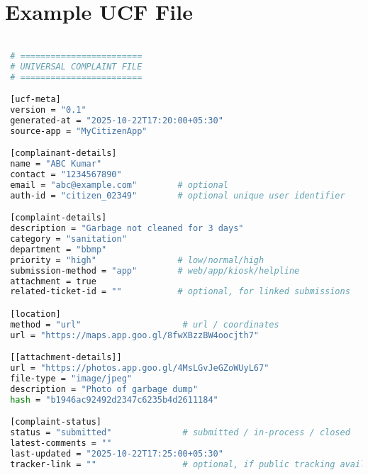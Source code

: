 
\section{Example UCF File}

\begin{lstlisting}[language=bash]

 # ========================
 # UNIVERSAL COMPLAINT FILE
 # ========================

 [ucf-meta]
 version = "0.1"
 generated-at = "2025-10-22T17:20:00+05:30"
 source-app = "MyCitizenApp"

 [complainant-details]
 name = "ABC Kumar"
 contact = "1234567890"
 email = "abc@example.com"        # optional
 auth-id = "citizen_02349"        # optional unique user identifier

 [complaint-details]
 description = "Garbage not cleaned for 3 days"
 category = "sanitation"
 department = "bbmp"
 priority = "high"                # low/normal/high
 submission-method = "app"        # web/app/kiosk/helpline
 attachment = true
 related-ticket-id = ""           # optional, for linked submissions

 [location]
 method = "url"                    # url / coordinates
 url = "https://maps.app.goo.gl/8fwXBzzBW4oocjth7"

 [[attachment-details]]
 url = "https://photos.app.goo.gl/4MsLGvJeGZoWUyL67"
 file-type = "image/jpeg"
 description = "Photo of garbage dump"
 hash = "b1946ac92492d2347c6235b4d2611184"

 [complaint-status]
 status = "submitted"              # submitted / in-process / closed
 latest-comments = ""
 last-updated = "2025-10-22T17:25:00+05:30"
 tracker-link = ""                 # optional, if public tracking available
 
\end{lstlisting}
